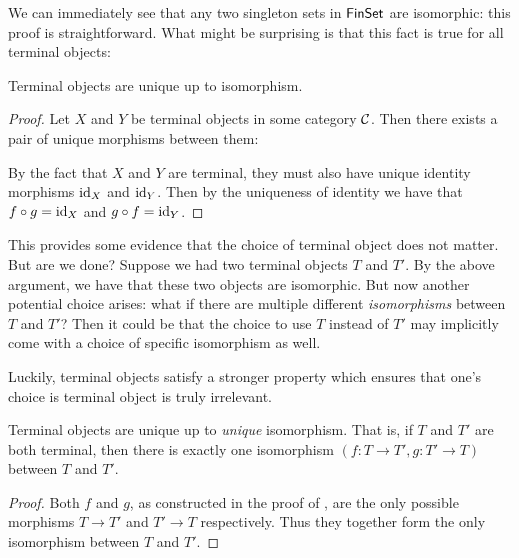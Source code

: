 We can immediately see that any two singleton sets in $\mathsf{FinSet}$ are isomorphic:
this proof is straightforward. What might be surprising is that this 
fact is true for all terminal objects:

\begin{theorem} \label{thm:terminal-object-unique}
  Terminal objects are unique up to isomorphism.
\end{theorem}
\begin{proof}
  Let $X$ and $Y$ be terminal objects in some category $\mathcal C$. 
  Then there exists a pair of unique morphisms between them:

  \begin{center}
\end{center}
By the fact that $X$ and $Y$ are terminal, they must also have unique identity
morphisms $\operatorname{id}_X$ and $\operatorname{id}_Y$. Then by the uniqueness of identity we have that $f \circ g = \operatorname{id}_X$ and $g \circ f = \operatorname{id}_Y$.
\end{proof}

This provides some evidence that the choice of terminal object does not matter.
  But are we done? Suppose we had two terminal objects \(T\) and \(T'\).
  By the above argument, we have that these two objects are isomorphic.
  But now another potential choice arises: what if there are multiple different
  \emph{isomorphisms} between \(T\) and \(T'\)?
  Then it could be that the choice to use \(T\) instead of \(T'\)
  may implicitly come with a choice of specific isomorphism as well.

  Luckily, terminal objects satisfy a stronger property
  which ensures that one's choice is terminal object is truly irrelevant.

\begin{proposition}
  Terminal objects are unique up to \emph{unique} isomorphism.
  That is, if \(T\) and \(T'\) are both terminal,
  then there is exactly one isomorphism
  \((f:T\to T',g:T'\to T)\)
  between \(T\) and \(T'\).
\end{proposition}
\begin{proof}
  Both \(f\) and \(g\), as constructed in the proof of
  ,
  are the only possible morphisms \(T \to T'\) and \(T'\to T\)
  respectively. Thus they together form the only isomorphism
  between \(T\) and \(T'\).
\end{proof}

